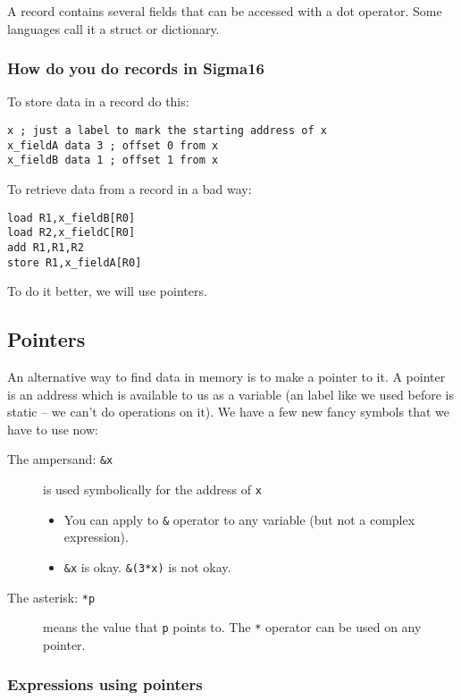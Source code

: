 A record contains several fields that can be accessed with a dot operator.
Some languages call it a struct or dictionary.

\subsubsection{How do you do records in Sigma16}\label{ssub:how_do_you_do_records_in_sigma16}

To store data in a record do this:
\begin{verbatim}
x ; just a label to mark the starting address of x
x_fieldA data 3 ; offset 0 from x
x_fieldB data 1 ; offset 1 from x
\end{verbatim}
To retrieve data from a record in a bad way:
\begin{verbatim}
load R1,x_fieldB[R0]
load R2,x_fieldC[R0]
add R1,R1,R2
store R1,x_fieldA[R0]
\end{verbatim}
To do it better, we will use pointers.

\subsection{Pointers}\label{sub:pointers}

An alternative way to find data in memory is to make a pointer to it.
A pointer is an address which is available to us as a variable (an label like we used before is static -- we can't do operations on it).
We have a few new fancy symbols that we have to use now:
\begin{description}
	\item[The ampersand: \texttt{&x}] is used symbolically for the address of \texttt{x}
	      \begin{itemize}
		      \item You can apply to \texttt{&} operator to any variable (but not a complex expression).
		      \item \texttt{&x} is okay.
		            \texttt{&(3*x)} is not okay.
	      \end{itemize}
	\item[The asterisk: \texttt{*p}] means the value that \texttt{p} points to.
	      The \texttt{*} operator can be used on any pointer.
\end{description}

\subsubsection{Expressions using pointers}\label{ssub:expressions_using_pointers}

